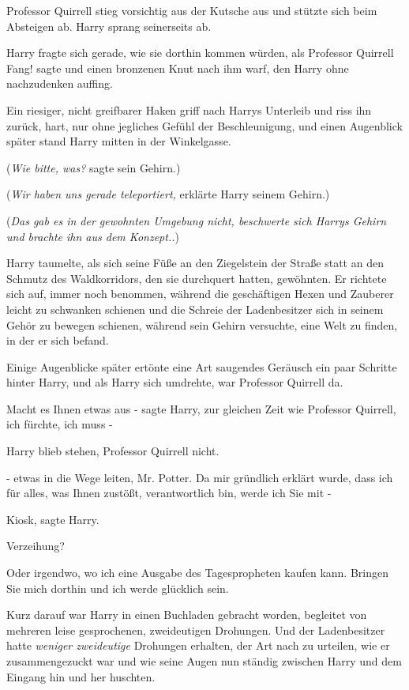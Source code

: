 Professor Quirrell stieg vorsichtig aus der Kutsche aus und stützte sich beim
Absteigen ab. Harry sprang seinerseits ab.

Harry fragte sich gerade, wie sie dorthin kommen würden, als Professor Quirrell
\glqq{}Fang!\grqq{} sagte und einen bronzenen Knut nach ihm warf, den Harry ohne
nachzudenken auffing.

Ein riesiger, nicht greifbarer Haken griff nach Harrys Unterleib und riss ihn
zurück, hart, nur ohne jegliches Gefühl der Beschleunigung, und einen Augenblick
später stand Harry mitten in der Winkelgasse.

(\emph{Wie bitte, was?} sagte sein Gehirn.)

(\emph{Wir haben uns gerade teleportiert,} erklärte Harry seinem Gehirn.)

(\emph{Das gab es in der gewohnten Umgebung nicht, beschwerte sich Harrys Gehirn
und brachte ihn aus dem Konzept..})

Harry taumelte, als sich seine Füße an den Ziegelstein der Straße statt an den
Schmutz des Waldkorridors, den sie durchquert hatten, gewöhnten. Er richtete
sich auf, immer noch benommen, während die geschäftigen Hexen und Zauberer
leicht zu schwanken schienen und die Schreie der Ladenbesitzer sich in seinem
Gehör zu bewegen schienen, während sein Gehirn versuchte, eine Welt zu finden,
in der er sich befand.

Einige Augenblicke später ertönte eine Art saugendes Geräusch ein paar Schritte
hinter Harry, und als Harry sich umdrehte, war Professor Quirrell da.

\glqq{}Macht es Ihnen etwas aus -\grqq{} sagte Harry, zur gleichen Zeit wie
Professor Quirrell, \glqq{}ich fürchte, ich muss -\grqq{}

Harry blieb stehen, Professor Quirrell nicht.

\glqq{}- etwas in die Wege leiten, Mr. Potter. Da mir gründlich erklärt wurde,
dass ich für alles, was Ihnen zustößt, verantwortlich bin, werde ich Sie mit
-\grqq{}

\glqq{}Kiosk\grqq{}, sagte Harry.

\glqq{}Verzeihung?\grqq{}

\glqq{}Oder irgendwo, wo ich eine Ausgabe des Tagespropheten kaufen kann.
Bringen Sie mich dorthin und ich werde glücklich sein.\grqq{}

Kurz darauf war Harry in einen Buchladen gebracht worden, begleitet von mehreren
leise gesprochenen, zweideutigen Drohungen. Und der Ladenbesitzer hatte
\emph{weniger zweideutige} Drohungen erhalten, der Art nach zu urteilen, wie er
zusammengezuckt war und wie seine Augen nun ständig zwischen Harry und dem
Eingang hin und her huschten.


